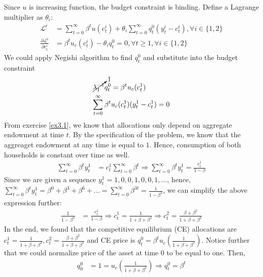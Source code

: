\documentclass[]{article}
\begin{document}
Since $u$ is increasing function, the budget constraint is binding. Define a Lagrange multiplier as $\theta_i$:
\begin{equation}
	\begin{split}
		\mathcal{L}^i& = \sum\limits_{t = 0}^\infty\beta^tu(c_t^i) + \theta_i\sum\limits_{t = 0}^{\infty}q_t^0(y_t^i - c_t^i), \forall i\in\{1, 2\}\\\nonumber
		\frac{\partial\mathcal{L}^i}{\partial c_t^i}& = \beta^tu_c(c_t^i) - \theta_iq_t^0 = 0, \forall t\geq1, \forall i\in\{1, 2\}
	\end{split}
\end{equation}
We could apply Negishi algorithm to find $q_t^0$ and substitute into the budget constraint
\begin{equation}
	\begin{split}
		\cancelto{1}{\lambda_1^{-1}}q_t^0& = \beta^tu_c(c_t^1)\\ \nonumber
		\sum\limits_{t = 0}^{\infty}\beta^t&u_c(c_t^1)(y_t^1 - c_t^1) = 0
	\end{split}
\end{equation}
From exercise \ref{ex3.1}, we know that allocations only depend on aggregate endowment at time $t$. By the specification of the problem, we know that the aggreaget endowment at any time is equal to $1$. Hence, consumption of both households is constant over time as well.
\begin{equation}
	\begin{split}
		\sum\limits_{t = 0}^{\infty}\beta^ty_t^1& = c_t^1\sum\limits_{t = 0}^{\infty}\beta^t \Longrightarrow
		\sum\limits_{t = 0}^{\infty}\beta^ty_t^1 = \frac{c_t^1}{1 - \beta} \nonumber
	\end{split}
\end{equation}
Since we are given a sequence $y_t^1 = 1, 0, 0, 1, 0, 0, 1, ...$, hence, $\sum\limits_{t = 0}^{\infty}\beta^ty_t^1 = \beta^0 + \beta^3 + \beta^6 + ... = \sum\limits_{t = 0}^\infty\beta^{3t} = \frac{1}{1 - \beta^3}$, we can simplify the above expression further:
\begin{equation}
	\begin{split}
		\frac{1}{1 - \beta^3}& = \frac{c_t^1}{1 - \beta} \Longrightarrow		c_t^1 = \frac{1}{1 + \beta + \beta^2} \Longrightarrow c_t^2 = \frac{\beta + \beta^2}{1 + \beta + \beta^2} \nonumber
	\end{split}
\end{equation}
In the end, we found that the competitive equilibrium (CE) allocations are $c_t^1 = \frac{1}{1 + \beta + \beta^2}, c_t^2 = \frac{\beta + \beta^2}{1 + \beta + \beta^2}$ and CE price is $q_t^0 = \beta^tu_c(\frac{1}{1 + \beta + \beta^2})$. Notice further that we could normalize price of the asset at time $0$ to be equal to one. Then,
\begin{equation}
	\begin{split}
		q_0^0& = 1 = u_c(\frac{1}{1 + \beta + \beta^2}) \Longrightarrow q_t^0 = \beta^t \nonumber
	\end{split}
\end{equation}
\end{document}
